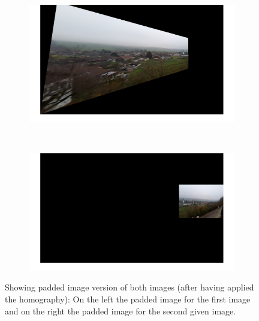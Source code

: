 \documentclass{paper}
\begin{document}
\begin{figure}[H]
    \centering
    \begin{subfigure}{0.45\textwidth}
        \includegraphics[width=\textwidth]{stitching/padded_left_img_1}
    \end{subfigure}
    ~
        \begin{subfigure}{0.45\textwidth}
        \includegraphics[width=\textwidth]{stitching/padded_right_img_1}
    \end{subfigure}
    
    \caption{Showing padded image version of both images (after having applied the homography): On the left the padded image for the first image and on the right the padded image for the second given image.}
    \label{fig:stitching_padded}       
\end{figure}
\end{document}
